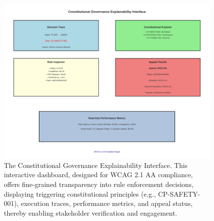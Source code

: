 \documentclass[manuscript,screen,9pt]{acmart}
\begin{document}
\begin{figure}[!htb]
	\centering
	\includegraphics[width=\linewidth,keepaspectratio]{figures/Figure_2_Enhanced_Explainability_Dashboard_Mockup.png}
	\caption[Constitutional Governance Explainability Interface]{The Constitutional Governance Explainability Interface. This interactive dashboard, designed for WCAG 2.1 AA compliance, offers fine-grained transparency into rule enforcement decisions, displaying triggering constitutional principles (e.g., CP-SAFETY-001), execution traces, performance metrics, and appeal status, thereby enabling stakeholder verification and engagement.}
	\label{fig:explainability_dashboard}
\end{figure}
\end{document}

